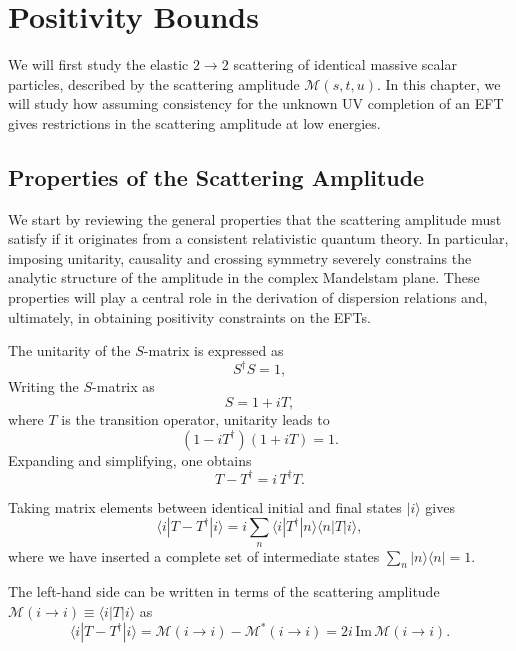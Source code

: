\chapter{Positivity Bounds}
\label{chap:positivity}

We will first study the elastic $2 \to 2$ scattering of identical massive scalar particles, described by the scattering amplitude $\mathcal{M}(s,t,u)$. In this chapter, we will study how assuming consistency for the unknown UV completion of an EFT gives restrictions in the scattering amplitude at low energies.

\section{Properties of the Scattering Amplitude}

We start by reviewing the general properties that the scattering amplitude must satisfy if it originates from a consistent relativistic quantum theory. In particular, imposing unitarity, causality and crossing symmetry severely constrains the analytic structure of the amplitude in the complex Mandelstam plane. These properties will play a central role in the derivation of dispersion relations and, ultimately, in obtaining positivity constraints on the EFTs.

The unitarity of the $S$-matrix is expressed as
\begin{equation}
S^\dagger S = 1,
\end{equation}
 Writing the $S$-matrix as
\begin{equation}
S = 1 + i T,
\end{equation}
where $T$ is the transition operator, unitarity leads to
\begin{equation}
(1 - i T^\dagger)(1 + i T) = 1.
\end{equation}
Expanding and simplifying, one obtains
\begin{equation}
T - T^\dagger = i\, T^\dagger T.
\end{equation}

Taking matrix elements between identical initial and final states $|i\rangle$ gives
\begin{equation}
\langle i | T - T^\dagger | i \rangle
= i \sum_n \langle i | T^\dagger | n \rangle \langle n | T | i \rangle,
\end{equation}
where we have inserted a complete set of intermediate states $\sum_n |n\rangle \langle n| = 1$.

The left-hand side can be written in terms of the scattering amplitude
$\mathcal{M}(i \to i) \equiv \langle i | T | i \rangle$ as
\begin{equation}
\langle i | T - T^\dagger | i \rangle
= \mathcal{M}(i \to i) - \mathcal{M}^*(i \to i)
= 2i\, \mathrm{Im}\,\mathcal{M}(i \to i).
\end{equation}

